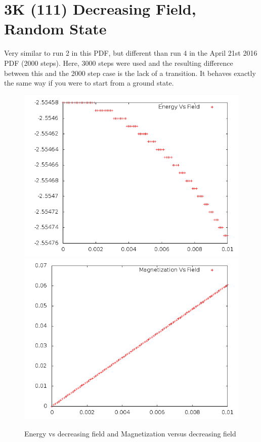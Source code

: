 \documentclass{article}
\begin{document}
\section{3K (111) Decreasing Field, Random State}
Very similar to run 2 in this PDF, but different than run 4 in the April 21st 2016 PDF (2000 steps).
Here, 3000 steps were used and the resulting difference between this and the 2000 step case is the lack of a
transition. It behaves exactly the same way if you were to start from a ground state. 
\begin{figure}[ht]
 \centering 
\includegraphics[scale=0.3]{111_3000/E005to000R.png}
\includegraphics[scale=0.3]{111_3000/M005to000R.png}
\caption{Energy vs decreasing field and Magnetization versus decreasing field}
\end{figure}
\end{document}
